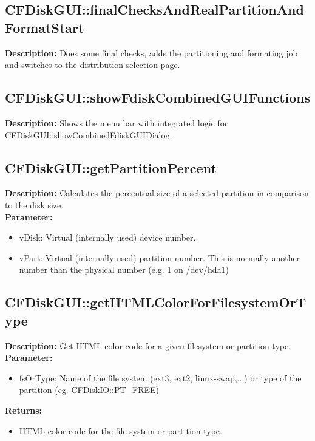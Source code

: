 \subsection{CFDiskGUI::finalChecksAndRealPartitionAndFormatStart}
\textbf{Description:} Does some final checks, adds the partitioning and formating job and switches to the distribution selection page.\\

\subsection{CFDiskGUI::showFdiskCombinedGUIFunctions}
\textbf{Description:} Shows the menu bar with integrated logic for CFDiskGUI::showCombinedFdiskGUIDialog.\\

\subsection{CFDiskGUI::getPartitionPercent}
\textbf{Description:} Calculates the percentual size of a selected partition in comparison to the disk size.\\
\textbf{Parameter:}
\begin{itemize}
\item vDisk: Virtual (internally used) device number.
\item vPart: Virtual (internally used) partition number. This is normally another number than the physical number (e.g. 1 on /dev/hda1)
\end{itemize}

\subsection{CFDiskGUI::getHTMLColorForFilesystemOrType}
\textbf{Description:} Get HTML color code for a given filesystem or partition type.\\
\textbf{Parameter:}
\begin{itemize}
\item fsOrType: Name of the file system (ext3, ext2, linux-swap,...) or type of the partition (eg. CFDiskIO::PT\_FREE)
\end{itemize}
\textbf{Returns:}
\begin{itemize}
\item HTML color code for the file system or partition type.
\end{itemize}

